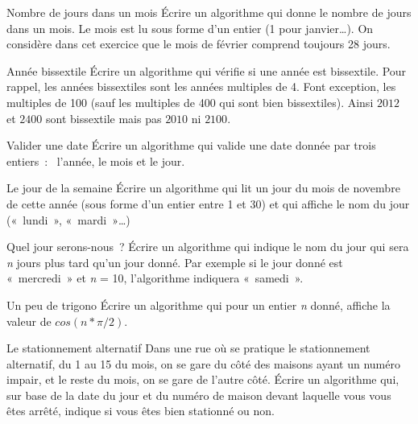 \begin{Exercice}{Nombre de jours dans un mois}
	Écrire un algorithme qui donne le nombre de jours dans un mois. 
	Le mois est lu sous forme d’un entier (1 pour janvier\dots).
	On considère dans cet exercice que le mois de février
	comprend toujours 28 jours.
\end{Exercice}

\begin{Exercice}{Année bissextile}
	Écrire un algorithme qui vérifie si une année est bissextile. 
	Pour rappel, les années bissextiles sont les années multiples de 4. 
	Font exception, les multiples de 100 
	(sauf les multiples de 400 qui sont bien bissextiles). 
	Ainsi $2012$ et $2400$ sont bissextile mais pas $2010$ ni $2100$.
\end{Exercice}

\begin{Exercice}{Valider une date}
	Écrire un algorithme qui valide une date donnée par trois entiers~:~
	l’année, le mois et le jour.
\end{Exercice}

\begin{Exercice}{Le jour de la semaine}
	Écrire un algorithme qui lit un jour du mois de novembre de cette année
	(sous forme d’un entier entre 1 et 30) 
	et qui affiche le nom du jour («~lundi~», «~mardi~»\dots)
\end{Exercice}

\begin{Exercice}{Quel jour serons-nous~?}
	Écrire un algorithme qui indique le nom du jour 
	qui sera \textit{n} jours plus tard qu’un jour donné. 
	Par exemple si le jour donné est «~mercredi~» et \textit{n} = 10, 
	l’algorithme indiquera «~samedi~».
\end{Exercice}

\begin{Exercice}{Un peu de trigono}
	Écrire un algorithme qui pour un entier \textit{n} donné, 
	affiche la valeur de $cos(n * \pi/2)$.
\end{Exercice}

\begin{Exercice}{Le stationnement alternatif}
	Dans une rue où se pratique le stationnement alternatif, 
	du 1 au 15 du mois, on se gare du côté des maisons ayant un numéro impair, 
	et le reste du mois, on se gare de l’autre côté. 
	Écrire un algorithme qui, sur base de la date du jour et du numéro de maison
	devant laquelle vous vous êtes arrêté, 
	indique si vous êtes bien stationné ou non.
\end{Exercice}
